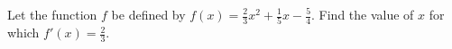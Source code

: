 Let the function $f$ be defined by $f(x)=\frac{2}{3}x^2+\frac{1}{5}x-\frac{5}{4}$.
Find the value of $x$ for which $f'(x)=\frac{2}{3}$.
\answercheck
